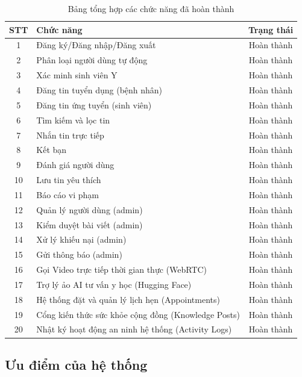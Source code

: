 \documentclass[13pt,a4paper]{extreport}
\begin{document}
\begin{table}[H]
\centering
\caption{Bảng tổng hợp các chức năng đã hoàn thành}
\begin{tabular}{|c|l|c|}
\hline
\textbf{STT} & \textbf{Chức năng} & \textbf{Trạng thái} \\
\hline
1 & Đăng ký/Đăng nhập/Đăng xuất & Hoàn thành \\
2 & Phân loại người dùng tự động & Hoàn thành \\
3 & Xác minh sinh viên Y & Hoàn thành \\
4 & Đăng tin tuyển dụng (bệnh nhân) & Hoàn thành \\
5 & Đăng tin ứng tuyển (sinh viên) & Hoàn thành \\
6 & Tìm kiếm và lọc tin & Hoàn thành \\
7 & Nhắn tin trực tiếp & Hoàn thành \\
8 & Kết bạn & Hoàn thành \\
9 & Đánh giá người dùng & Hoàn thành \\
10 & Lưu tin yêu thích & Hoàn thành \\
11 & Báo cáo vi phạm & Hoàn thành \\
12 & Quản lý người dùng (admin) & Hoàn thành \\
13 & Kiểm duyệt bài viết (admin) & Hoàn thành \\
14 & Xử lý khiếu nại (admin) & Hoàn thành \\
15 & Gửi thông báo (admin) & Hoàn thành \\
16 & Gọi Video trực tiếp thời gian thực (WebRTC) & Hoàn thành \\
17 & Trợ lý ảo AI tư vấn y học (Hugging Face) & Hoàn thành \\
18 & Hệ thống đặt và quản lý lịch hẹn (Appointments) & Hoàn thành \\
19 & Cổng kiến thức sức khỏe cộng đồng (Knowledge Posts) & Hoàn thành \\
20 & Nhật ký hoạt động an ninh hệ thống (Activity Logs) & Hoàn thành \\
\hline
\end{tabular}
\end{table}

\subsection{Ưu điểm của hệ thống}
\end{document}
